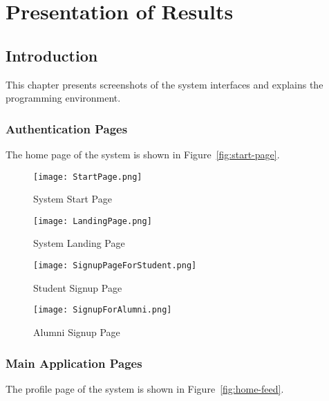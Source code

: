 \chapter{Presentation of Results}
\section{Introduction}
This chapter presents screenshots of the system interfaces and explains the programming environment.

\subsection{Authentication Pages}
The home page of the system is shown in Figure~\ref{fig:start-page}.

\begin{figure}[htbp]
    \centering
    \begin{minipage}[b]{0.45\linewidth}
        \centering
        \texttt{[image: StartPage.png]}
        \caption{System Start Page}
        \label{fig:start-page}
    \end{minipage}
    \hfill
    \begin{minipage}[b]{0.45\linewidth}
        \centering
        \texttt{[image: LandingPage.png]}
        \caption{System Landing Page}
        \label{fig:landing-page}
    \end{minipage}
    \vspace{1em}
    
    \begin{minipage}[b]{0.45\linewidth}
        \centering
        \texttt{[image: SignupPageForStudent.png]}
        \caption{Student Signup Page}
        \label{fig:student-signup}
    \end{minipage}
    \hfill
    \begin{minipage}[b]{0.45\linewidth}
        \centering
        \texttt{[image: SignupForAlumni.png]}
        \caption{Alumni Signup Page}
        \label{fig:alumni-signup}
    \end{minipage}
\end{figure}

\subsection{Main Application Pages}
The profile page of the system is shown in Figure~\ref{fig:home-feed}.

